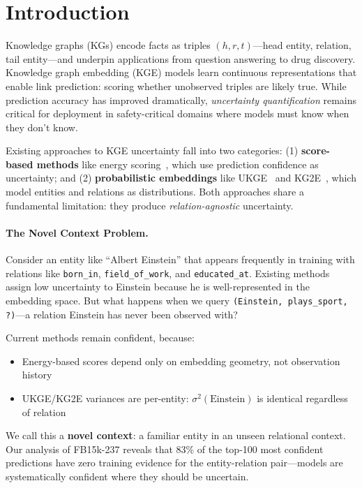 \section{Introduction}
\label{sec:intro}

Knowledge graphs (KGs) encode facts as triples $(h, r, t)$---head entity, relation, tail entity---and underpin applications from question answering to drug discovery. Knowledge graph embedding (KGE) models learn continuous representations that enable link prediction: scoring whether unobserved triples are likely true. While prediction accuracy has improved dramatically, \emph{uncertainty quantification} remains critical for deployment in safety-critical domains where models must know when they don't know.

Existing approaches to KGE uncertainty fall into two categories: (1) \textbf{score-based methods} like energy scoring~\citep{liu2020energy}, which use prediction confidence as uncertainty; and (2) \textbf{probabilistic embeddings} like UKGE~\citep{chen2019embedding} and KG2E~\citep{he2015learning}, which model entities and relations as distributions. Both approaches share a fundamental limitation: they produce \emph{relation-agnostic} uncertainty.

\paragraph{The Novel Context Problem.}
Consider an entity like ``Albert Einstein'' that appears frequently in training with relations like \texttt{born\_in}, \texttt{field\_of\_work}, and \texttt{educated\_at}. Existing methods assign low uncertainty to Einstein because he is well-represented in the embedding space. But what happens when we query \texttt{(Einstein, plays\_sport, ?)}---a relation Einstein has never been observed with?

Current methods remain confident, because:
\begin{itemize}
    \item Energy-based scores depend only on embedding geometry, not observation history
    \item UKGE/KG2E variances are per-entity: $\sigma^2(\text{Einstein})$ is identical regardless of relation
\end{itemize}

We call this a \textbf{novel context}: a familiar entity in an unseen relational context. Our analysis of FB15k-237 reveals that 83\% of the top-100 most confident predictions have zero training evidence for the entity-relation pair---models are systematically confident where they should be uncertain.

